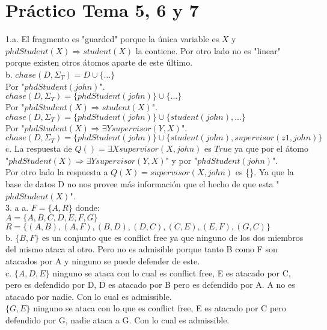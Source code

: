 \chapter{Práctico Tema 5, 6 y 7}

1.a. El fragmento es "guarded" porque la única variable es $X$ y $phdStudent(X) \Longrightarrow student(X)$ la contiene. Por otro lado no es "linear" porque existen otros átomos aparte de este último. \\

b. $chase(D, \Sigma_{T}) = D \cup \{...\}$ \\

Por "$phdStudent(john)$".\\

$chase(D, \Sigma_{T}) = \{phdStudent(john)\} \cup \{ ... \}$ \\

Por "$phdStudent(X) \Longrightarrow student(X)$". \\

$chase(D, \Sigma_{T}) = \{phdStudent(john)\} \cup \{student(john), ...\}$\\

Por "$phdStudent(X) \Longrightarrow \exists Y supervisor(Y, X)$". \\

$chase(D, \Sigma_{T}) = \{phdStudent(john)\} \cup \{student(john), supervisor(z1, john) \}$ \\

c. La respuesta de $Q() = \exists X supervisor(X, john)$ es $True$ ya que por el átomo "$phdStudent(X) \Longrightarrow \exists Y supervisor(Y, X)$" y por "$phdStudent(john)$". \\

Por otro lado la respuesta a $Q(X) = supervisor(X, john)$ es \{\}. Ya que la base de datos D no nos provee más información que el hecho de que 
esta "$phdStudent(X)$". \\


3. a
a. $F=\{A, R\}$ donde: \\
$A=\{A, B, C, D, E, F, G\}$ \\
$R=\{(A, B), (A, F), (B, D), (D, C), (C, E), (E, F), (G, C)\}$ \\

b. $\{B, F\}$ es un conjunto que es conflict free ya que ninguno de los dos miembros del mismo ataca al otro. Pero no es admisible porque tanto B como F son atacados por A y ninguno se puede defender de este.\\

c. $\{A, D, E\}$ ninguno se ataca con lo cual es conflict free, E es atacado por C, pero es defendido por D, D es atacado por B pero es defendido por A. A no es atacado por nadie. Con lo cual es admissible. \\

$\{G, E\}$ ninguno se ataca con lo que es conflict free, E es atacado por C pero defendido por G, nadie ataca a G. Con lo cual es admissible.

\bigskip